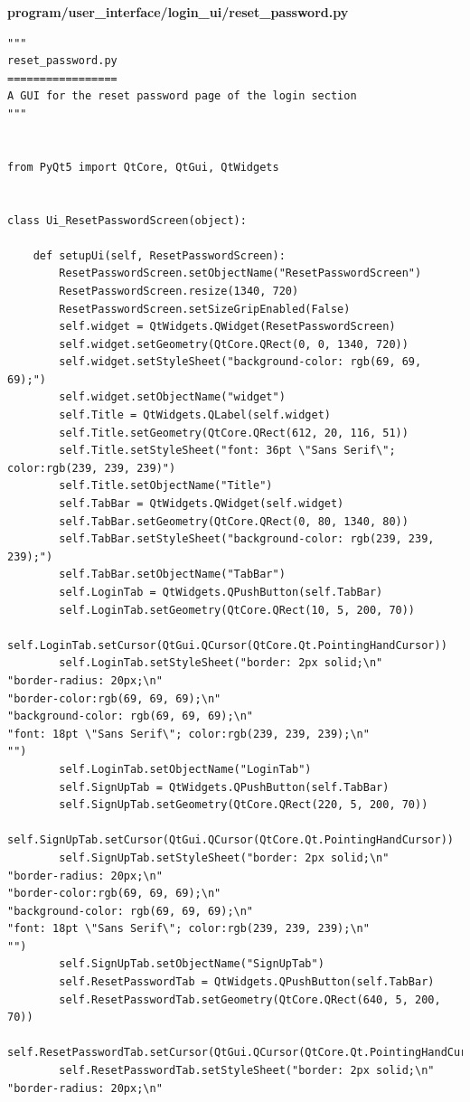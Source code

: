 \documentclass{article}
\begin{document}
\textbf{program/user\_interface/login\_ui/reset\_password.py}
\begin{lstlisting}
"""
reset_password.py
=================
A GUI for the reset password page of the login section
"""


from PyQt5 import QtCore, QtGui, QtWidgets


class Ui_ResetPasswordScreen(object):

    def setupUi(self, ResetPasswordScreen):
        ResetPasswordScreen.setObjectName("ResetPasswordScreen")
        ResetPasswordScreen.resize(1340, 720)
        ResetPasswordScreen.setSizeGripEnabled(False)
        self.widget = QtWidgets.QWidget(ResetPasswordScreen)
        self.widget.setGeometry(QtCore.QRect(0, 0, 1340, 720))
        self.widget.setStyleSheet("background-color: rgb(69, 69, 69);")
        self.widget.setObjectName("widget")
        self.Title = QtWidgets.QLabel(self.widget)
        self.Title.setGeometry(QtCore.QRect(612, 20, 116, 51))
        self.Title.setStyleSheet("font: 36pt \"Sans Serif\"; color:rgb(239, 239, 239)")
        self.Title.setObjectName("Title")
        self.TabBar = QtWidgets.QWidget(self.widget)
        self.TabBar.setGeometry(QtCore.QRect(0, 80, 1340, 80))
        self.TabBar.setStyleSheet("background-color: rgb(239, 239, 239);")
        self.TabBar.setObjectName("TabBar")
        self.LoginTab = QtWidgets.QPushButton(self.TabBar)
        self.LoginTab.setGeometry(QtCore.QRect(10, 5, 200, 70))
        self.LoginTab.setCursor(QtGui.QCursor(QtCore.Qt.PointingHandCursor))
        self.LoginTab.setStyleSheet("border: 2px solid;\n"
"border-radius: 20px;\n"
"border-color:rgb(69, 69, 69);\n"
"background-color: rgb(69, 69, 69);\n"
"font: 18pt \"Sans Serif\"; color:rgb(239, 239, 239);\n"
"")
        self.LoginTab.setObjectName("LoginTab")
        self.SignUpTab = QtWidgets.QPushButton(self.TabBar)
        self.SignUpTab.setGeometry(QtCore.QRect(220, 5, 200, 70))
        self.SignUpTab.setCursor(QtGui.QCursor(QtCore.Qt.PointingHandCursor))
        self.SignUpTab.setStyleSheet("border: 2px solid;\n"
"border-radius: 20px;\n"
"border-color:rgb(69, 69, 69);\n"
"background-color: rgb(69, 69, 69);\n"
"font: 18pt \"Sans Serif\"; color:rgb(239, 239, 239);\n"
"")
        self.SignUpTab.setObjectName("SignUpTab")
        self.ResetPasswordTab = QtWidgets.QPushButton(self.TabBar)
        self.ResetPasswordTab.setGeometry(QtCore.QRect(640, 5, 200, 70))
        self.ResetPasswordTab.setCursor(QtGui.QCursor(QtCore.Qt.PointingHandCursor))
        self.ResetPasswordTab.setStyleSheet("border: 2px solid;\n"
"border-radius: 20px;\n"

\end{lstlisting}
\end{document}

